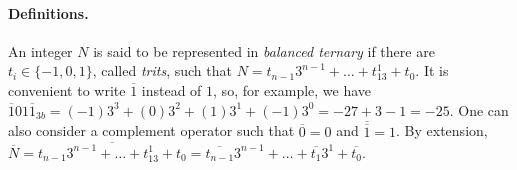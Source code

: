 \paragraph{Definitions.} An integer \(N\) is said to be represented
in \emph{balanced ternary} if there are \(t_i \in \{-1,0,1\}\), called
\emph{trits}, such that \(N = t_{n-1}3^{n-1} + \dots + t_13^1 +
t_0\). It is convenient to write \(\overline{1}\) instead of \(1\),
so, for example, we have \(\overline{1}01\overline{1}_{3b} =
(-1)3^3+(0)3^2+(1)3^1+(-1)3^0 = -27 + 3 - 1 = -25\). One can also
consider a complement operator such that \(\overline{0} = 0\)
and \(\overline{\overline{1}} = 1\). By extension, \(\overline{N}
= \overline{t_{n-1}3^{n-1} + \dots + t_13^1 + t_0}
= \overline{t_{n-1}}3^{n-1} + \dots + \overline{t_1}3^1
+ \overline{t_0}\).
